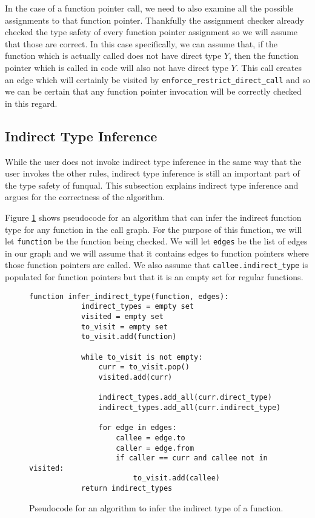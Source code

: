 In the case of a function pointer call, we need to also examine all the possible assignments to that function pointer.  Thankfully the assignment checker already checked the type safety of every function pointer assignment so we will assume that those are correct.  In this case specifically, we can assume that, if the function which is actually called does not have direct type $Y$, then the function pointer which is called in code will also not have direct type $Y$.  This call creates an edge which will certainly be visited by \lstinline{enforce_restrict_direct_call} and so we can be certain that any function pointer invocation will be correctly checked in this regard.

\subsection{Indirect Type Inference}\label{sec:rules:rules:inference}

While the user does not invoke indirect type inference in the same way that the user invokes the other rules, indirect type inference is still an important part of the type safety of funqual.  This subsection explains indirect type inference and argues for the correctness of the algorithm.  

Figure \ref{lst:rules:rules:infer_indirect_type} shows pseudocode for an algorithm that can infer the indirect function type for any function in the call graph.  For the purpose of this function, we will let \lstinline{function} be the function being checked.  We will let \lstinline{edges} be the list of edges in our graph and we will assume that it contains edges to function pointers where those function pointers are called.  We also assume that \lstinline{callee.indirect_type} is populated for function pointers but that it is an empty set for regular functions.  

\begin{figure}
    \begin{lstlisting}[gobble=8]
        function infer_indirect_type(function, edges):
            indirect_types = empty set
            visited = empty set
            to_visit = empty set
            to_visit.add(function)

            while to_visit is not empty:
                curr = to_visit.pop()
                visited.add(curr)

                indirect_types.add_all(curr.direct_type)
                indirect_types.add_all(curr.indirect_type)

                for edge in edges:
                    callee = edge.to
                    caller = edge.from
                    if caller == curr and callee not in visited:
                        to_visit.add(callee)
            return indirect_types
    \end{lstlisting}
    \caption{Pseudocode for an algorithm to infer the indirect type of a function.}
    \label{lst:rules:rules:infer_indirect_type}
\end{figure}

